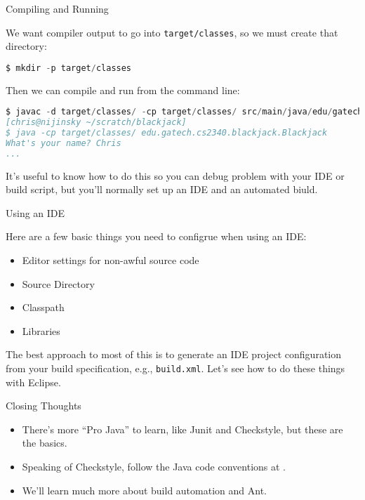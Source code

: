 \documentclass{beamer}
\begin{document}
\begin{frame}[fragile]{Compiling and Running}

We want compiler output to go into {\tt target/classes}, so we must create that directory:
\begin{lstlisting}[language=Java]
$ mkdir -p target/classes
\end{lstlisting}

Then we can compile and run from the command line:

\begin{lstlisting}[language=Java]
$ javac -d target/classes/ -cp target/classes/ src/main/java/edu/gatech/cs2340/blackjack/*.java
[chris@nijinsky ~/scratch/blackjack]
$ java -cp target/classes/ edu.gatech.cs2340.blackjack.Blackjack
What's your name? Chris
...
\end{lstlisting}

It's useful to know how to do this so you can debug problem with your IDE or build script, but you'll normally set up an IDE and an automated biuld.

\end{frame}

\begin{frame}[fragile]{Using an IDE}


Here are a few basic things you need to configrue when using an IDE:
\begin{itemize}
\item Editor settings for non-awful source code
\item Source Directory
\item Classpath
\item Libraries
\end{itemize}
The best approach to most of this is to generate an IDE project configuration from your build specification, e.g., {\tt build.xml}.  Let's see how to do these things with Eclipse.

\end{frame}


\begin{frame}[fragile]{Closing Thoughts}


\begin{itemize}
\item  There's more ``Pro Java'' to learn, like Junit and Checkstyle, but these are the basics.
\item Speaking of Checkstyle, follow the Java code conventions at .
\item We'll learn much more about build automation and Ant.
\end{itemize}


\end{frame}
\end{document}
